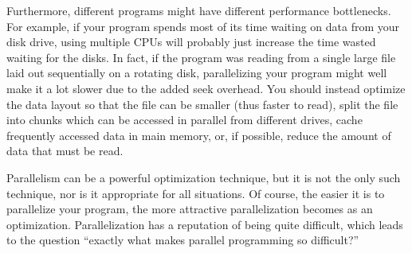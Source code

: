 Furthermore, different programs might have different performance
bottlenecks.
For example, if your program spends most of its time
waiting on data from your disk drive,
using multiple CPUs will probably just increase the time wasted waiting
for the disks.
In fact, if the program was reading from a single large file laid out
sequentially on a rotating disk, parallelizing your program might
well make it a lot slower due to the added seek overhead.
You should instead optimize the data layout so that
the file can be smaller (thus faster to read), split the file into chunks
which can be accessed in parallel from different drives,
cache frequently accessed data in main memory,
or, if possible,
reduce the amount of data that must be read.

\QuickQuizEnd

Parallelism can be a powerful optimization technique, but
it is not the only such technique, nor is it appropriate for all
situations.
Of course, the easier it is to parallelize your program, the
more attractive parallelization becomes as an optimization.
Parallelization has a reputation of being quite difficult,
which leads to the question ``exactly what makes parallel
programming so difficult?''

